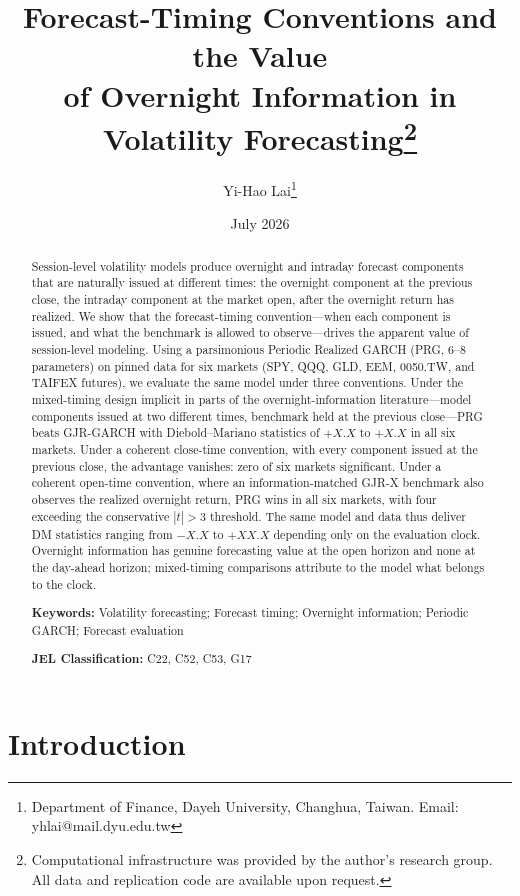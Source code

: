 \documentclass[11pt,a4paper]{article}
\title{Forecast-Timing Conventions and the Value \\ of Overnight Information in Volatility Forecasting\thanks{%
Computational infrastructure was provided by the author's research group.
All data and replication code are available upon request.}}
\author{Yi-Hao Lai\thanks{%
Department of Finance, Dayeh University, Changhua, Taiwan.
Email: yhlai@mail.dyu.edu.tw}}
\date{July 2026}
\begin{document}
\maketitle

\begin{abstract}
Session-level volatility models produce overnight and intraday forecast components that are naturally issued at different times: the overnight component at the previous close, the intraday component at the market open, after the overnight return has realized. We show that the forecast-timing convention---when each component is issued, and what the benchmark is allowed to observe---drives the apparent value of session-level modeling. Using a parsimonious Periodic Realized GARCH (PRG, 6--8 parameters) on pinned data for six markets (SPY, QQQ, GLD, EEM, 0050.TW, and TAIFEX futures), we evaluate the same model under three conventions. Under the mixed-timing design implicit in parts of the overnight-information literature---model components issued at two different times, benchmark held at the previous close---PRG beats GJR-GARCH with Diebold--Mariano statistics of
$+X.X$ to $+X.X$
in all six markets. Under a coherent close-time convention, with every component issued at the previous close, the advantage vanishes: zero of six markets significant. Under a coherent open-time convention, where an information-matched GJR-X benchmark also observes the realized overnight return, PRG wins in all six markets, with four exceeding the conservative $|t|>3$ threshold. The same model and data thus deliver DM statistics ranging from
$-X.X$ to $+XX.X$
depending only on the evaluation clock. Overnight information has genuine forecasting value at the open horizon and none at the day-ahead horizon; mixed-timing comparisons attribute to the model what belongs to the clock.

\medskip\noindent
\textbf{Keywords:} Volatility forecasting; Forecast timing; Overnight information; Periodic GARCH; Forecast evaluation

\medskip\noindent
\textbf{JEL Classification:} C22, C52, C53, G17
\end{abstract}

\newpage

\section{Introduction}
\end{document}
